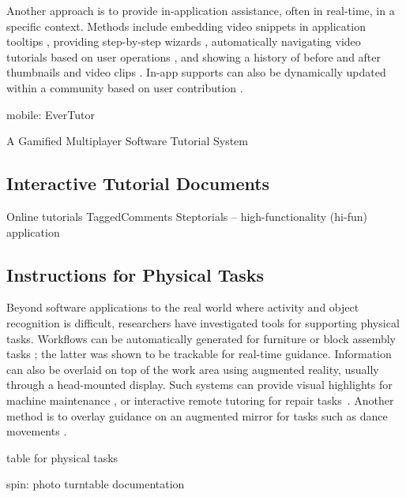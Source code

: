 Another approach is to provide in-application assistance, often in real-time, in a specific context. Methods include embedding video snippets in application tooltips \cite{Grossman:2010wr}, providing step-by-step wizards \cite{Bergman:2005:DocWizards,Kelleher:2005:STD:1054972.1055047,Fernquist:2011:SRE:2047196.2047245}, automatically navigating video tutorials based on user operations \cite{Pongnumkul:2011ju}, and showing a history of before and after thumbnails and video clips \cite{Grossman:2010jz}. In-app supports can also be dynamically updated within a community based on user contribution \cite{Lafreniere:2013ff,Matejka:2009:CCR:1622176.1622214}.

mobile: EverTutor \cite{Wang:2014:EAC:2556288.2557407}

A Gamified Multiplayer Software Tutorial System \cite{Li:2014:CGM:2556288.2556954}

\subsection{Interactive Tutorial Documents}

Online tutorials
TaggedComments \cite{Bunt:2014:TPI:2556288.2557118}
Steptorials \cite{Lieberman:2014:SML:2557500.2557543} -- high-functionality (hi-fun) application

\subsection{Instructions for Physical Tasks}

Beyond software applications to the real world where activity and object recognition is difficult, researchers have investigated tools for supporting physical tasks. Workflows can be automatically generated for furniture \cite{agrawala2003designing} or block assembly tasks \cite{Gupta:2012ku}; the latter was shown to be trackable for real-time guidance.
%
Information can also be overlaid on top of the work area using augmented reality, usually through a head-mounted display. Such systems can provide visual highlights for machine maintenance \cite{Henderson:2011ff}, or interactive remote tutoring for repair tasks~\cite{Gurevich:2012ko}. Another method is to overlay guidance on an augmented mirror for tasks such as dance movements \cite{Anderson:2013:YEM:2501988.2502045}.

table for physical tasks \cite{Knibbe:2015:SMI:2817721.2817741}

spin: photo turntable \cite{Tseng:2015:SPT:2771839.2771869}
documentation \cite{Tseng:2016:makeology}

